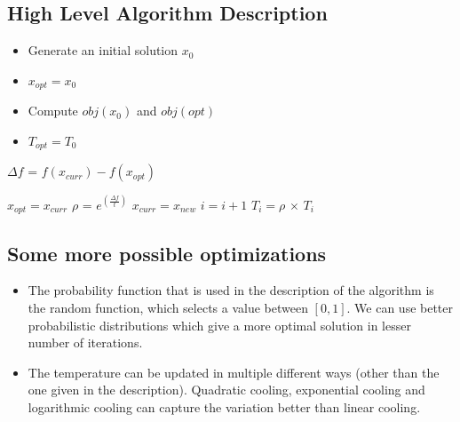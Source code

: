 \documentclass[conference]{IEEEtran}
\begin{document}
\newpage
\subsection{High Level Algorithm Description}
\begin{algorithm}

    
    
    \begin{itemize}
        \item{Generate an initial solution $x_{0}$}
        \item{$x_{opt} = x_{0}$}
        \item{Compute ${obj}(x_0)$ and ${obj}({opt})$}
        \item{$T_{opt} = T_0$}\\
    \end{itemize}
    
    { 
        $\Delta f$ = $f(x_{curr}) - f(x_{opt})$
        
        {
            $x_{opt} = x_{curr}$\;
        }
        \EndIf
        {
            $\rho$ = $e^{(\frac{\Delta f}{t})}$\;
            {
                $x_{curr} = x_{new}$\;
            }
            \EndIf
        }
        \EndIf
        $i = i + 1$\;
        $T_{i} = \rho$ $\times$ $T_{i}$
    }
\end{algorithm}

\subsection{Some more possible optimizations}
\begin{itemize}
	 \item{The probability function that is used in the description of the algorithm is the random function, which selects a value between $[0, 1]$. We can use better probabilistic distributions which give a more optimal solution in lesser number of iterations.}
	 \item{The temperature can be updated in multiple different ways (other than the one given in the description). Quadratic cooling, exponential cooling and logarithmic cooling can capture the variation better than linear cooling.}
\end{itemize}
\end{document}
